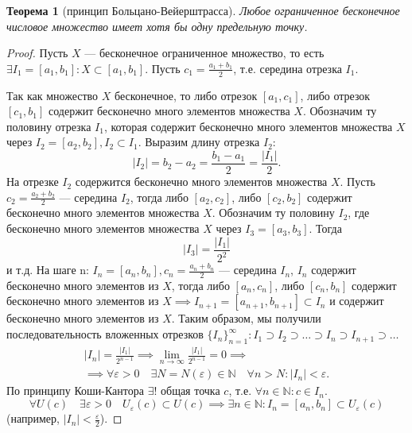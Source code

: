 \documentclass[a4paper,12pt]{article} %
\newtheorem{theorem}{Теорема}[section]
\theoremstyle{remark}
\theoremstyle{definition}
\begin{document}
\begin{theorem}[принцип Больцано-Вейерштрасса]
	Любое ограниченное бесконечное числовое множество имеет хотя бы одну предельную точку.
\end{theorem}
\begin{proof}
	Пусть $X$ --- бесконечное ограниченное множество, то есть $\exists I_1 =[a_1, b_1] : X\subset [a_1, b_1]$.
	Пусть $c_1=\frac{a_1+b_1}{2}$, т.е. середина отрезка $I_1$.
	\begin{center}
	\end{center}
	Так как множество $X$ бесконечное, то либо отрезок $[a_1, c_1]$, либо отрезок $[c_1, b_1]$ содержит бесконечно много элементов множества $X$. Обозначим ту половину отрезка $I_1$, которая содержит бесконечно много элементов множества $X$ через $I_2 = [a_2, b_2], I_2\subset I_1$. Выразим длину отрезка $I_2$:
\[
	|I_2| = b_2-a_2 = \frac{b_1-a_1}{2} = \frac{|I_1|}{2}
.\] 
На отрезке $I_2$ содержится бесконечно много элементов множества $X$.
Пусть $c_2=\frac{a_2+b_2}{2}$ --- середина $I_2$, тогда либо $[a_2, c_2]$, либо $[c_2, b_2]$ содержит бесконечно много элементов множества $X$. Обозначим ту половину $I_2$, где бесконечно много элементов множества $X$ через $I_3 = [a_3, b_3]$. Тогда
\[
|I_3| = \frac{|I_1|}{2^2}
\] 
и т.д. На шаге n: $I_n=[a_n, b_n], c_n = \frac{a_n + b_n}{2}$ --- середина $I_n$, $I_n$ содержит бесконечно много элементов из $X$, тогда либо $[a_n, c_n]$, либо $[c_n, b_n]$ содержит бесконечно много элементов из $X \implies I_{n+1}=[a_{n+1}, b_{n+1}]\subset I_n$ и содержит бесконечно много элементов из $X$. Таким образом, мы получили последовательность вложенных отрезков $\{I_n\}_{n=1}^{\infty} : I_1\supset I_2\supset \ldots\supset I_n\supset I_{n+1}\supset \ldots$
\begin{multline}
	|I_n|=\frac{|I_1|}{2^{n-1}} \implies \lim_{n \to \infty} \frac{|I_1|}{2^{n-1}} = 0 \implies \\
	\implies \forall \varepsilon>0 \quad \exists N=N(\varepsilon)\in \mathbb{N} \quad \forall n>N : |I_n| < \varepsilon.
\end{multline}
По принципу Коши-Кантора $\exists !$ общая точка $c$, т.е. $\forall n\in \mathbb{N} : c\in I_n$.
\[
	\forall U(c) \quad \exists \varepsilon>0 \quad U_\varepsilon(c) \subset U(c) \implies \exists n\in \mathbb{N} : I_n=[a_n, b_n] \subset U_\varepsilon(c)
\] 
(например, $|I_n| < \frac{\varepsilon}{2}$).


\end{proof}
\end{document}
